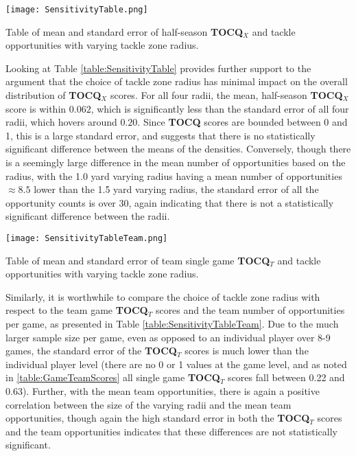 \documentclass{article}
\begin{document}
\begin{table}[H]
    \centering
    \texttt{[image: SensitivityTable.png]}
    \caption{Table of mean and standard error of half-season \textbf{TOCQ$_X$} and tackle opportunities with varying tackle zone radius.}
    \label{table:SensitivityTable}
\end{table}

Looking at Table \ref{table:SensitivityTable} provides further support to the argument that the choice of tackle zone radius has minimal impact on the overall distribution of \textbf{TOCQ$_X$} scores. For all four radii, the mean, half-season \textbf{TOCQ$_X$} score is within $0.062$, which is significantly less than the standard error of all four radii, which hovers around $0.20$. Since \textbf{TOCQ} scores are bounded between 0 and 1, this is a large standard error, and suggests that there is no statistically significant difference between the means of the densities. Conversely, though there is a seemingly large difference in the mean number of opportunities based on the radius, with the 1.0 yard varying radius having a mean number of opportunities $\approx 8.5$ lower than the 1.5 yard varying radius, the standard error of all the opportunity counts is over 30, again indicating that there is not a statistically significant difference between the radii.

\begin{table}[H]
    \centering
    \texttt{[image: SensitivityTableTeam.png]}
    \caption{Table of mean and standard error of team single game \textbf{TOCQ$_T$} and tackle opportunities with varying tackle zone radius.}
    \label{table:SensitivityTableTeam}
\end{table}

Similarly, it is worthwhile to compare the choice of tackle zone radius with respect to the team game \textbf{TOCQ$_T$} scores and the team number of opportunities per game, as presented in Table \ref{table:SensitivityTableTeam}. Due to the much larger sample size per game, even as opposed to an individual player over 8-9 games, the standard error of the \textbf{TOCQ$_T$} scores is much lower than the individual player level (there are no 0 or 1 values at the game level, and as noted in \ref{table:GameTeamScores} all single game \textbf{TOCQ$_T$} scores fall between 0.22 and 0.63). Further, with the mean team opportunities, there is again a positive correlation between the size of the varying radii and the mean team opportunities, though again the high standard error in both the \textbf{TOCQ$_T$} scores and the team opportunities indicates that these differences are not statistically significant.
\end{document}
